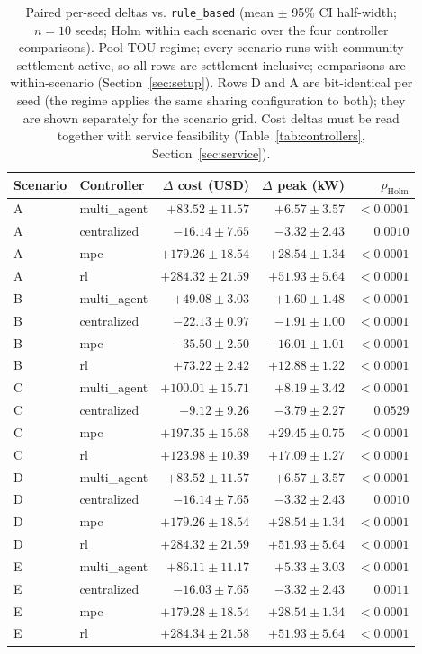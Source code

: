 \documentclass[11pt,a4paper]{article}
\newcommand{\agent}[1]{\texttt{#1}}
\begin{document}
\begin{table}[htbp]
\centering
\caption{Paired per-seed deltas vs. \agent{rule\_based} (mean $\pm$ 95\% CI half-width; $n{=}10$ seeds; Holm within each scenario over the four controller comparisons). Pool-TOU regime; every scenario runs with community settlement active, so all rows are settlement-inclusive; comparisons are within-scenario (Section~\ref{sec:setup}). Rows D and A are bit-identical per seed (the regime applies the same sharing configuration to both); they are shown separately for the scenario grid. Cost deltas must be read together with service feasibility (Table~\ref{tab:controllers}, Section~\ref{sec:service}).}
\label{tab:deltas}
\begin{tabular}{llrrr}
\toprule
Scenario & Controller & $\Delta$ cost (USD) & $\Delta$ peak (kW) & $p_{\mathrm{Holm}}$ \\
\midrule
A & multi\_agent & $+83.52 \pm 11.57$ & $+6.57 \pm 3.57$ & $< 0.0001$ \\
A & centralized & $-16.14 \pm 7.65$ & $-3.32 \pm 2.43$ & $0.0010$ \\
A & mpc & $+179.26 \pm 18.54$ & $+28.54 \pm 1.34$ & $< 0.0001$ \\
A & rl & $+284.32 \pm 21.59$ & $+51.93 \pm 5.64$ & $< 0.0001$ \\
B & multi\_agent & $+49.08 \pm 3.03$ & $+1.60 \pm 1.48$ & $< 0.0001$ \\
B & centralized & $-22.13 \pm 0.97$ & $-1.91 \pm 1.00$ & $< 0.0001$ \\
B & mpc & $-35.50 \pm 2.50$ & $-16.01 \pm 1.01$ & $< 0.0001$ \\
B & rl & $+73.22 \pm 2.42$ & $+12.88 \pm 1.22$ & $< 0.0001$ \\
C & multi\_agent & $+100.01 \pm 15.71$ & $+8.19 \pm 3.42$ & $< 0.0001$ \\
C & centralized & $-9.12 \pm 9.26$ & $-3.79 \pm 2.27$ & $0.0529$ \\
C & mpc & $+197.35 \pm 15.68$ & $+29.45 \pm 0.75$ & $< 0.0001$ \\
C & rl & $+123.98 \pm 10.39$ & $+17.09 \pm 1.27$ & $< 0.0001$ \\
D & multi\_agent & $+83.52 \pm 11.57$ & $+6.57 \pm 3.57$ & $< 0.0001$ \\
D & centralized & $-16.14 \pm 7.65$ & $-3.32 \pm 2.43$ & $0.0010$ \\
D & mpc & $+179.26 \pm 18.54$ & $+28.54 \pm 1.34$ & $< 0.0001$ \\
D & rl & $+284.32 \pm 21.59$ & $+51.93 \pm 5.64$ & $< 0.0001$ \\
E & multi\_agent & $+86.11 \pm 11.17$ & $+5.33 \pm 3.03$ & $< 0.0001$ \\
E & centralized & $-16.03 \pm 7.65$ & $-3.32 \pm 2.43$ & $0.0011$ \\
E & mpc & $+179.28 \pm 18.54$ & $+28.54 \pm 1.34$ & $< 0.0001$ \\
E & rl & $+284.34 \pm 21.58$ & $+51.93 \pm 5.64$ & $< 0.0001$ \\
\bottomrule
\end{tabular}
\end{table}
\end{document}
